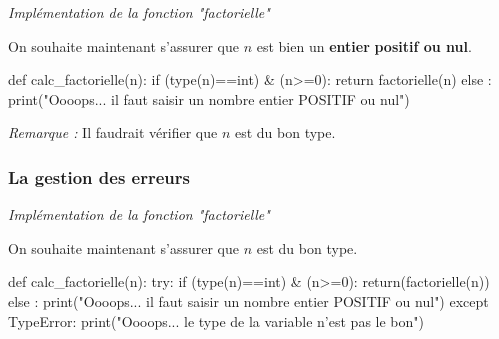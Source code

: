 \documentclass[10pt,fleqn]{article} %
\begin{document}
\begin{exemple}
\textit{Implémentation de la fonction "factorielle"}

On souhaite maintenant s'assurer que $n$ est bien un \textbf{entier} \textbf{positif ou nul}.



\begin{py}
\begin{python}
def calc_factorielle(n):
    if (type(n)==int) & (n>=0):
        return factorielle(n) 
    else :
        print("Oooops... il faut saisir un nombre entier POSITIF ou nul")
\end{python}
\end{py}


\textit{Remarque :} Il faudrait vérifier que $n$ est du bon type.
\end{exemple}


\subsubsection*{La gestion des erreurs}


\begin{exemple}
\textit{Implémentation de la fonction "factorielle"}

On souhaite maintenant s'assurer que $n$ est du bon type.


\begin{py}
\begin{python}[moreemph={[4], 46, 48}]
def calc_factorielle(n):
    try:
        if (type(n)==int) & (n>=0):
            return(factorielle(n))
        else :
            print("Oooops... il faut saisir un nombre entier POSITIF ou nul")
    except TypeError:
        print("Oooops... le type de la variable n'est pas le bon")
\end{python}
\end{py}


\end{exemple}
\end{document}
